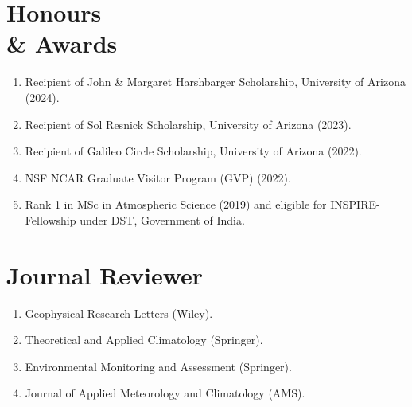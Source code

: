 \documentclass[margin,line]{resume}
\begin{document}
\begin{resume}
		\vspace*{-3mm}
				
		\section{\mysidestyle \textbf{\textcolor{sep}{Honours \\\& Awards}}}
		\begin{enumerate}[topsep=0.1pt, partopsep=1pt, itemsep=0.1pt, parsep=0.1pt, leftmargin=12pt,label=\roman{*})]
			\item Recipient of John \& Margaret Harshbarger Scholarship, University of Arizona (2024).
			\item Recipient of Sol Resnick Scholarship, University of Arizona (2023).
			\item Recipient of Galileo Circle Scholarship, University of Arizona (2022).
			\item NSF NCAR Graduate Visitor Program (GVP) (2022).
			\item Rank 1 in MSc in Atmospheric Science (2019) and eligible for INSPIRE-Fellowship under DST, Government of India.
			
		\end{enumerate} 
		\vspace*{-3mm}
	
		\section{\mysidestyle \textbf{\textcolor{sep}{Journal Reviewer}}}
		\begin{enumerate}[topsep=0.1pt, partopsep=1pt, itemsep=0.1pt, parsep=0.1pt, leftmargin=12pt,label=\roman{*})]
			\item Geophysical Research Letters (Wiley).
			\item Theoretical and Applied Climatology (Springer).
			\item Environmental Monitoring and Assessment (Springer).
			\item 
			Journal of Applied Meteorology and Climatology (AMS).
			

\end{enumerate}
\end{resume}
\end{document}
